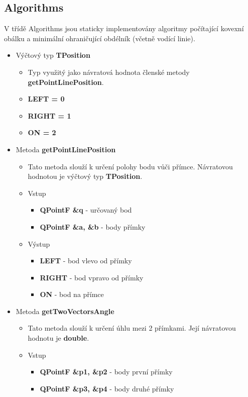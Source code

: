 \documentclass[a4paper, 12pt]{article}
\begin{document}
\subsection{Algorithms}
V třídě Algorithms jsou staticky implementovány algoritmy počítající kovexní obálku a minimální ohraničující obdélník (včetně vodící linie).

\begin{itemize}

	\item Výčtový typ \textbf{TPosition}
		\begin{itemize}
			\item Typ využitý jako návratová hodnota členské metody \textbf{getPointLinePosition}.
			\item \textbf{LEFT = 0}
			\item \textbf{RIGHT = 1}
			\item \textbf{ON = 2}
		\end{itemize}

	\item Metoda \textbf{getPointLinePosition}
		\begin{itemize}
			\item Tato metoda slouží k určení polohy bodu vůči přímce. Návratovou hodnotou je výčtový typ \textbf{TPosition}.
			\item Vstup
				\begin{itemize}
					\item \textbf{QPointF \&q} - určovaný bod
					\item \textbf{QPointF \&a, \&b} - body přímky
				\end{itemize}
			\item Výstup
				\begin{itemize}
					\item \textbf{LEFT} - bod vlevo od přímky
					\item \textbf{RIGHT} - bod vpravo od přímky
					\item \textbf{ON} - bod na přímce
				\end{itemize}

		\end{itemize}

	\item Metoda \textbf{getTwoVectorsAngle}
		\begin{itemize}
			\item Tato metoda slouží k určení úhlu mezi 2 přímkami. Její návratovou hodnotu je \textbf{double}.
			\item Vstup
				\begin{itemize}
					\item \textbf{QPointF \&p1, \&p2} - body první přímky
					\item \textbf{QPointF \&p3, \&p4} - body druhé přímky
				\end{itemize}
		

\end{itemize}
\end{itemize}
\end{document}
